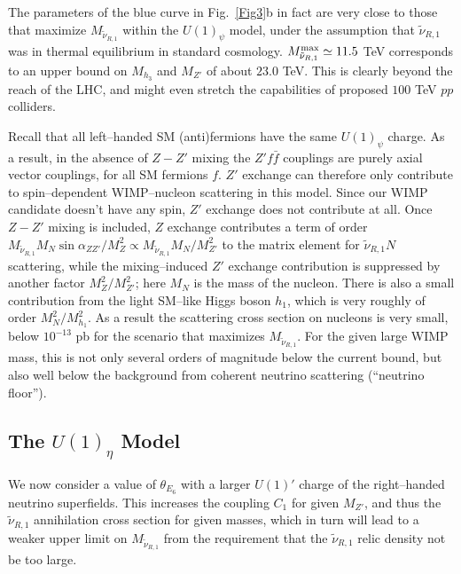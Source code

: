 \documentclass[a4paper,11pt]{article}
\begin{document}
The parameters of the blue curve in Fig.~\ref{Fig3}b in fact are
very close to those that maximize $M_{\tilde \nu_{R,1}}$ within the
$U(1)_\psi$ model, under the assumption that $\tilde \nu_{R,1}$ was in
thermal equilibrium in standard cosmology.
$M^{\rm max}_{\tilde{\nu}_{R,1}} \simeq 11.5$ TeV corresponds to an
upper bound on $M_{h_3}$ and $M_{Z'}$ of about $23.0$ TeV. This is
clearly beyond the reach of the LHC, and might even stretch the
capabilities of proposed $100$ TeV $pp$ colliders.

Recall that all left--handed SM (anti)fermions have the same
$U(1)_\psi$ charge. As a result, in the absence of $Z - Z'$ mixing the
$Z' f \bar f$ couplings are purely axial vector couplings, for all SM
fermions $f$. $Z'$ exchange can therefore only contribute to
spin--dependent WIMP--nucleon scattering in this model. Since our WIMP
candidate doesn't have any spin, $Z'$ exchange does not contribute at
all. Once $Z-Z'$ mixing is included, $Z$ exchange contributes a term
of order
$M_{\tilde \nu_{R,1}} M_N \sin \alpha_{ZZ'} / M_Z^2 \propto M_{\tilde
  \nu_{R,1}} M_N / M_{Z'}^2$
to the matrix element for $\tilde \nu_{R,1} N$ scattering, while the
mixing--induced $Z'$ exchange contribution is suppressed by another
factor $M_Z^2 / M_{Z'}^2$; here $M_N$ is the mass of the
nucleon. There is also a small contribution from the light SM--like
Higgs boson $h_1$, which is very roughly of order $M_N^2 /
M_{h_1}^2$. As a result the scattering cross section on nucleons is very small,
below $10^{-13}$ pb for the scenario that maximizes
$M_{\tilde \nu_{R,1}}$. For the given large WIMP mass, this is not
only several orders of magnitude below the current bound, but also
well below the background from coherent neutrino scattering
(``neutrino floor'').


\subsection{The $U(1)_\eta$ Model} 
\label{subsection4.3}

We now consider a value of $\theta_{E_6}$ with a larger $U(1)'$ charge
of the right--handed neutrino superfields. This increases the coupling
$C_1$ for given $M_{Z'}$, and thus the $\tilde \nu_{R,1}$ annihilation
cross section for given masses, which in turn will lead to a weaker
upper limit on $M_{\tilde \nu_{R,1}}$ from the requirement that the
$\tilde \nu_{R,1}$ relic density not be too large.
\end{document}
